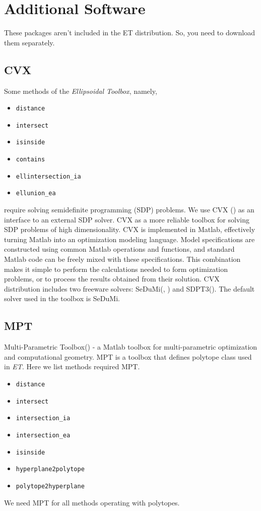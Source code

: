 \section{Additional Software}
These packages aren't included in the ET distribution. 
So, you need to download them separately. 
\subsection{CVX}
Some methods of the {\it Ellipsoidal Toolbox}, namely,
\begin{itemize}
\item {\tt distance}
\item {\tt intersect}
\item {\tt isinside}
\item {\tt contains}
\item {\tt ellintersection\_ia}
\item {\tt ellunion\_ea}
\end{itemize}
require solving semidefinite programming (SDP) problems.
We use CVX (\cite{cvxhp}) as an
interface to an external SDP solver. CVX as a more reliable toolbox
for solving SDP problems of high dimensionality. 
CVX is implemented in Matlab, effectively turning Matlab into an 
optimization modeling language. Model specifications are constructed
using common Matlab operations and functions, and standard 
Matlab code can be freely mixed with these specifications. 
This combination makes it simple to perform the calculations needed 
to form optimization problems, or to process the results
obtained from their solution. CVX distribution includes two freeware 
solvers: SeDuMi(\cite{sedumi}, \cite{sedumihp})
and SDPT3(\cite{sdpt}). The default solver used in the toolbox is SeDuMi.

\subsection{MPT}
Multi-Parametric Toolbox(\cite{mpt}) - a Matlab toolbox for multi-parametric
optimization and computational geometry. MPT is a toolbox 
that defines polytope class
used in {\it ET}.
Here we list methods required MPT.
\begin{itemize}
\item {\tt distance}
\item {\tt intersect}
\item {\tt intersection\_ia}
\item {\tt intersection\_ea}
\item {\tt isinside}
\item {\tt hyperplane2polytope}
\item {\tt polytope2hyperplane}
\end{itemize}
We need MPT for all methods operating with polytopes.


